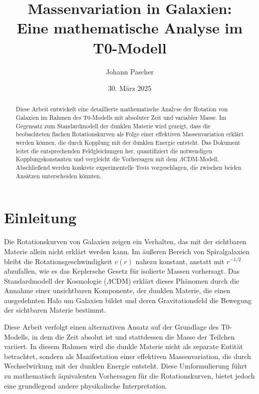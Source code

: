 \documentclass[a4paper,12pt]{article}
\begin{document}
	
	\title{Massenvariation in Galaxien: \\Eine mathematische Analyse im T0-Modell}
	\author{Johann Pascher}
	\date{30. März 2025}
	\maketitle
	
	\begin{abstract}
		Diese Arbeit entwickelt eine detaillierte mathematische Analyse der Rotation von Galaxien im Rahmen des T0-Modells mit absoluter Zeit und variabler Masse. Im Gegensatz zum Standardmodell der dunklen Materie wird gezeigt, dass die beobachteten flachen Rotationskurven als Folge einer effektiven Massenvariation erklärt werden können, die durch Kopplung mit der dunklen Energie entsteht. Das Dokument leitet die entsprechenden Feldgleichungen her, quantifiziert die notwendigen Kopplungskonstanten und vergleicht die Vorhersagen mit dem $\Lambda$CDM-Modell. Abschließend werden konkrete experimentelle Tests vorgeschlagen, die zwischen beiden Ansätzen unterscheiden könnten.
	\end{abstract}
	
	\tableofcontents
	\newpage
	
	\section{Einleitung}
	
	Die Rotationskurven von Galaxien zeigen ein Verhalten, das mit der sichtbaren Materie allein nicht erklärt werden kann. Im äußeren Bereich von Spiralgalaxien bleibt die Rotationsgeschwindigkeit $v(r)$ nahezu konstant, anstatt mit $r^{-1/2}$ abzufallen, wie es das Keplersche Gesetz für isolierte Massen vorhersagt. Das Standardmodell der Kosmologie ($\Lambda$CDM) erklärt dieses Phänomen durch die Annahme einer unsichtbaren Komponente, der dunklen Materie, die einen ausgedehnten Halo um Galaxien bildet und deren Gravitationsfeld die Bewegung der sichtbaren Materie bestimmt.
	
	Diese Arbeit verfolgt einen alternativen Ansatz auf der Grundlage des T0-Modells, in dem die Zeit absolut ist und stattdessen die Masse der Teilchen variiert. In diesem Rahmen wird die dunkle Materie nicht als separate Entität betrachtet, sondern als Manifestation einer effektiven Massenvariation, die durch Wechselwirkung mit der dunklen Energie entsteht. Diese Umformulierung führt zu mathematisch äquivalenten Vorhersagen für die Rotationskurven, bietet jedoch eine grundlegend andere physikalische Interpretation.
	
\end{document}
